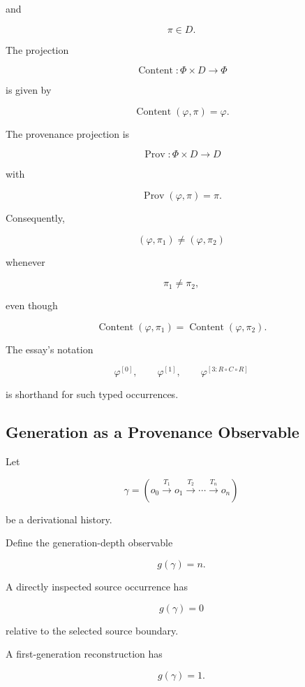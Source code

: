 \documentclass[
  11pt,
  a4paper,
  DIV=12,
  BCOR=0mm,
  parskip=half-
]{scrartcl}
\newcommand{\Prov}{\operatorname{Prov}}
\newcommand{\Content}{\operatorname{Content}}
\theoremstyle{definition}
\theoremstyle{plain}
\theoremstyle{remark}
\begin{document}
and

\[
  \pi\in D.
\]

The projection

\[
  \Content:
  \Phi\times D
  \to
  \Phi
\]

is given by

\[
  \Content(\varphi,\pi)=\varphi.
\]

The provenance projection is

\[
  \Prov:
  \Phi\times D
  \to
  D
\]

with

\[
  \Prov(\varphi,\pi)=\pi.
\]

Consequently,

\[
  (\varphi,\pi_1)
  \neq
  (\varphi,\pi_2)
\]

whenever

\[
  \pi_1\neq\pi_2,
\]

even though

\[
  \Content(\varphi,\pi_1)
  =
  \Content(\varphi,\pi_2).
\]

The essay's notation

\[
  \varphi^{[0]},
  \qquad
  \varphi^{[1]},
  \qquad
  \varphi^{[3:R\circ C\circ R]}
\]

is shorthand for such typed occurrences.


\subsection{Generation as a Provenance Observable}
\label{app:generation-depth}

Let

\[
  \gamma
  =
  (
    o_0
    \xrightarrow{T_1}
    o_1
    \xrightarrow{T_2}
    \cdots
    \xrightarrow{T_n}
    o_n
  )
\]

be a derivational history.

Define the generation-depth observable

\[
  g(\gamma)=n.
\]

A directly inspected source occurrence has

\[
  g(\gamma)=0
\]

relative to the selected source boundary.

A first-generation reconstruction has

\[
  g(\gamma)=1.
\]
\end{document}
